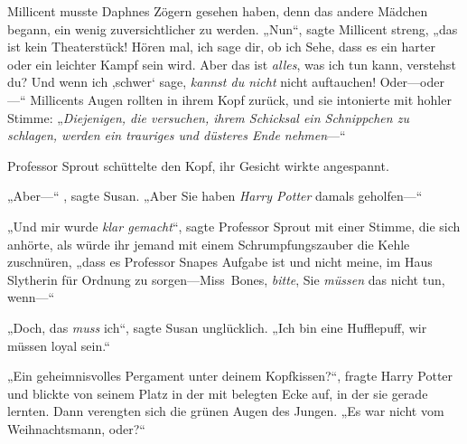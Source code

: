 Millicent musste Daphnes Zögern gesehen haben, denn das andere Mädchen begann, ein wenig zuversichtlicher zu werden. „Nun“, sagte Millicent streng, „das ist kein Theaterstück! Hören mal, ich sage dir, ob ich Sehe, dass es ein harter oder ein leichter Kampf sein wird. Aber das ist \emph{alles}, was ich tun kann, verstehst du? Und wenn ich ‚schwer‘ sage, \emph{kannst du nicht} nicht auftauchen! Oder—oder—“ Millicents Augen rollten in ihrem Kopf zurück, und sie intonierte mit hohler Stimme: „\emph{Diejenigen, die versuchen, ihrem Schicksal ein Schnippchen zu schlagen, werden ein trauriges und düsteres Ende nehmen}—“

\later

Professor Sprout schüttelte den Kopf, ihr Gesicht wirkte angespannt.

„Aber—“ , sagte Susan. „Aber Sie haben \emph{Harry Potter} damals geholfen—“

„Und mir wurde \emph{klar gemacht}“, sagte Professor Sprout mit einer Stimme, die sich anhörte, als würde ihr jemand mit einem Schrumpfungszauber die Kehle zuschnüren, „dass es Professor Snapes Aufgabe ist und nicht meine, im Haus Slytherin für Ordnung zu sorgen—Miss~Bones, \emph{bitte}, Sie \emph{müssen} das nicht tun, wenn—“

„Doch, das \emph{muss} ich“, sagte Susan unglücklich. „Ich bin eine Hufflepuff, wir müssen loyal sein.“

\later

„Ein geheimnisvolles Pergament unter deinem Kopfkissen?“, fragte Harry Potter und blickte von seinem Platz in der mit  belegten Ecke auf, in der sie gerade lernten. Dann verengten sich die grünen Augen des Jungen. „Es war nicht vom Weihnachtsmann, oder?“

